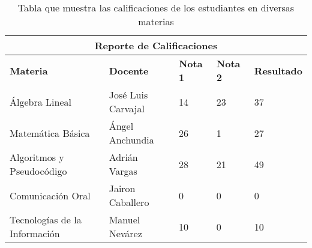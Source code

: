 \begin{table}[h]
        \centering
        \begin{tabularx}{\textwidth}{|X|X|X|X|p{5cm}|}
        \hline
        \multicolumn{5}{|c|}{\textbf{Reporte de Calificaciones}}\\\hline
        \textbf{Materia} & \textbf{Docente} & \textbf{Nota 1} & \textbf{Nota 2} & \textbf{Resultado} \\ \hline
        Álgebra Lineal & José Luis Carvajal & 14 & 23 & 37 \\ \hline
        Matemática Básica & Ángel Anchundia & 26 & 1 & 27 \\ \hline
        Algoritmos y Pseudocódigo & Adrián Vargas & 28 & 21 & 49 \\ \hline
        Comunicación Oral & Jairon Caballero & 0 & 0 & 0 \\ \hline
        Tecnologías de la Información & Manuel Nevárez & 10 & 0 & 10 \\ \hline
        \end{tabularx}
        \caption{Tabla que muestra las calificaciones de los estudiantes en diversas materias}
        \end{table}